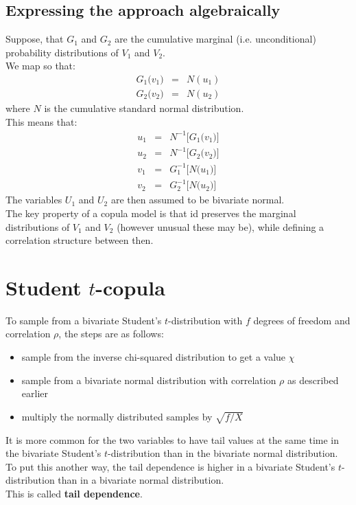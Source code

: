 \subsection{Expressing the approach algebraically}
Suppose, that $G_{1}$ and $G_{2}$ are the cumulative marginal (i.e. unconditional) probability distributions of $V_{1}$ and $V_{2}$.\\
We map so that:
\begin{eqnarray}
	G_{1}\big(v_{1}\big) &=& N(u_{1})\\
	G_{2}\big(v_{2}\big) &=& N(u_{2})
\end{eqnarray}
where $N$ is the cumulative standard normal distribution.\\
This means that:
\begin{eqnarray}
	u_{1} &=& N^{-1}\big[G_{1}\big(v_{1}\big)\big]\\
	u_{2} &=& N^{-1}\big[G_{2}\big(v_{2}\big)\big]\\
	v_{1} &=& G_{1}^{-1}\big[N\big(u_{1}\big)\big]\\
	v_{2} &=& G_{2}^{-1}\big[N\big(u_{2}\big)\big]
\end{eqnarray}
The variables $U_{1}$ and $U_{2}$ are then assumed to be bivariate normal.\\
The key property of a copula model is that id preserves the marginal distributions of $V_{1}$ and $V_{2}$ (however unusual these may be), while defining a correlation structure between then.

\section{Student $t$-copula}
To sample from a bivariate Student's $t$-distribution with $f$ degrees of freedom and correlation $\rho$, the steps are as follows:
\begin{itemize}
	\item sample from the inverse chi-squared distribution to get a value $\chi$
	\item sample from a bivariate normal distribution with correlation $\rho$ as described earlier
	\item multiply the normally distributed samples by $\sqrt{f/X}$
\end{itemize}
It is more common for the two variables to have tail values at the same time in the bivariate Student's $t$-distribution than in the bivariate normal distribution. To put this another way, the tail dependence is higher in a bivariate Student's $t$-distribution than in a bivariate normal distribution.\\
This is called \textbf{\color{blue}tail dependence}.


